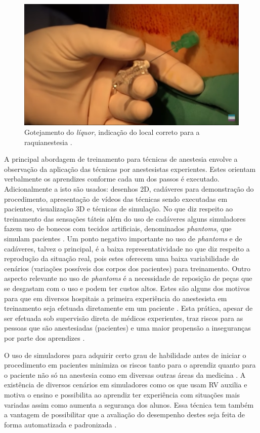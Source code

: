 \begin{figure}[!ht]
   \centering
   \includegraphics[width=0.6\linewidth]{capitulos/figuras/3.GotejamentoLiquor.png}
   \caption{Gotejamento do \textit{líquor}, indicação do local correto para a raquianestesia \cite{Londero2018}.}
   \label{fig:gotejamentoLiquor}
\end{figure}

A principal abordagem de treinamento para técnicas de anestesia envolve a observação da aplicação das técnicas por anestesistas experientes. Estes orientam verbalmente os aprendizes conforme cada um dos passos é executado. Adicionalmente a isto são usados: desenhos 2D, cadáveres para demonstração do procedimento, apresentação de vídeos das técnicas sendo executadas em pacientes, visualização 3D e técnicas de simulação. No que diz respeito ao treinamento das sensações táteis além do uso de cadáveres alguns simuladores fazem uso de bonecos com tecidos artificiais, denominados \textit{phantoms}, que simulam pacientes \cite{Dreifaldt2006}. Um ponto negativo importante no uso de \textit{phantoms} e de cadáveres, talvez o principal, é a baixa representatividade no que diz respeito a reprodução da situação real, pois estes oferecem uma baixa variabilidade de cenários (variações possíveis dos corpos dos pacientes) para treinamento.  Outro aspecto relevante no uso de \textit{phantoms} é a necessidade de reposição de peças que se desgastam com o uso e podem ter custos altos. Estes são alguns dos motivos para que em diversos hospitais a primeira experiência do anestesista em treinamento seja efetuada diretamente em um paciente \cite{Aggarwal2009, Grantcharov2008, Smith2005, Watterson2007}. Esta prática, apesar de ser efetuada sob supervisão direta de médicos experientes, traz riscos para as pessoas que são anestesiadas (pacientes) e uma maior propensão a inseguranças por parte dos aprendizes \cite{Elmofty2017}. 

O uso de simuladores para adquirir certo grau de habilidade antes de iniciar o procedimento em pacientes minimiza os riscos tanto para o aprendiz quanto para o paciente não só na anestesia \cite{Escobar-Castillejos2016, Yunoki2018} como em diversas outras áreas da medicina \cite{Akhtar2014, Alvarez-Lopez2020, Hamm2022}. A existência de diversos cenários em simuladores como os que usam \acrfull{RV} auxilia e motiva o ensino e possibilita ao aprendiz ter experiência com situações mais variadas assim como aumenta a segurança dos alunos. Essa técnica tem também a vantagem de possibilitar que a avaliação do desempenho destes seja feita de forma automatizada e padronizada \cite{Willis2014}. 

